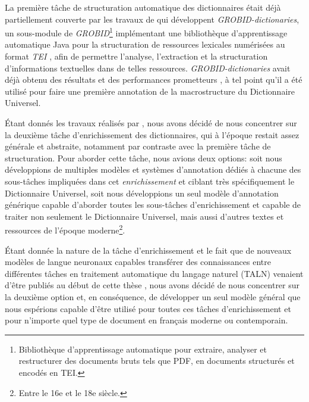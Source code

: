 La première tâche de structuration automatique des dictionnaires était déjà partiellement couverte par les travaux de \citet{khemakhem-etal-2017-automatic,khemakhem-etal-2018-enhancing} qui développent \emph{GROBID-dictionaries}, un sous-module de \emph{GROBID}\footnote{Bibliothèque d'apprentissage automatique pour extraire, analyser et restructurer des documents bruts tels que PDF, en documents structurés et encodés en TEI.} \citep{lopez-etal-2018-grobid} implémentant une bibliothèque d'apprentissage automatique Java pour la structuration de ressources lexicales numérisées au format \emph{TEI} \citep{tei-2018-guidelines}, afin de permettre l'analyse, l'extraction et la structuration d'informations textuelles dans de telles ressources. \emph{GROBID-dictionaries} avait déjà obtenu des résultats et des performances prometteurs \citep{khemakhem-2020-standard}, à tel point qu'il a été utilisé pour faire une première annotation de la macrostructure du Dictionnaire Universel.

Étant donnés les travaux réalisés par \citet{khemakhem-2020-standard}, nous avons décidé de nous concentrer sur la deuxième tâche d'enrichissement des dictionnaires, qui à l'époque restait assez générale et abstraite, notamment par contraste avec la première tâche de structuration. Pour aborder cette tâche, nous avions deux options: soit nous développions de multiples modèles et systèmes d'annotation dédiés à chacune des sous-tâches impliquées dans cet \emph{enrichissement} et ciblant très spécifiquement le Dictionnaire Universel, soit nous développions un seul modèle d'annotation générique capable d'aborder toutes les sous-tâches d'enrichissement et capable de traiter non seulement le Dictionnaire Universel, mais aussi d'autres textes et ressources de l'époque moderne\footnote{Entre le 16e et le 18e siècle.}.

Étant donnée la nature de la tâche d'enrichissement et le fait que de nouveaux modèles de langue neuronaux capables transférer des connaissances entre différentes tâches en traitement automatique du langage naturel (TALN) venaient d'être publiés au début de cette thèse \cite{peters-etal-2018-deep,devlin-etal-2019-bert}, nous avons décidé de nous concentrer sur la deuxième option et, en conséquence, de développer un seul modèle général que nous espérions capable d'être utilisé pour toutes ces tâches d'enrichissement et pour n'importe quel type de document en français moderne ou contemporain.

